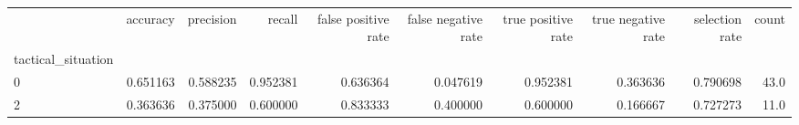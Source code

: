 \begin{tabular}{lrrrrrrrrr}
\toprule
{} &  accuracy &  precision &    recall &  false positive rate &  false negative rate &  true positive rate &  true negative rate &  selection rate &  count \\
tactical\_situation &           &            &           &                      &                      &                     &                     &                 &        \\
\midrule
0                  &  0.651163 &   0.588235 &  0.952381 &             0.636364 &             0.047619 &            0.952381 &            0.363636 &        0.790698 &   43.0 \\
2                  &  0.363636 &   0.375000 &  0.600000 &             0.833333 &             0.400000 &            0.600000 &            0.166667 &        0.727273 &   11.0 \\
\bottomrule
\end{tabular}
